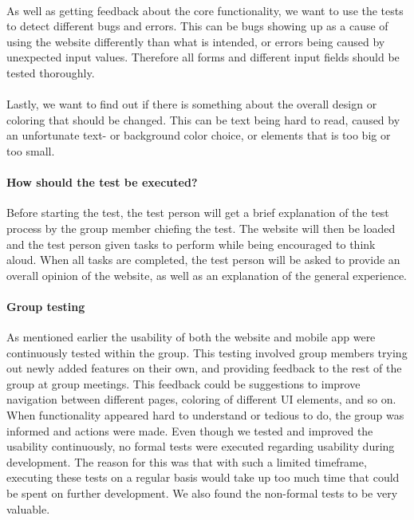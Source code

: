 \paragraph{} As well as getting feedback about the core functionality, we want to use the tests to detect different bugs and errors. This can be bugs showing up as a cause of using the website differently than what is intended, or errors being caused by unexpected input values. Therefore all forms and different input fields should be tested thoroughly.

\paragraph{} Lastly, we want to find out if there is something about the overall design or coloring that should be changed. This can be text being hard to read, caused by an unfortunate text- or background color choice, or elements that is too big or too small.  

\paragraph{How should the test be executed?} Before starting the test, the test person will get a brief explanation of the test process by the group member chiefing the test. The website will then be loaded and the test person given tasks to perform while being encouraged to think aloud. When all tasks are completed, the test person will be asked to provide an overall opinion of the website, as well as an explanation of the general experience. 

\paragraph{Group testing}
As mentioned earlier the usability of both the website and mobile app were continuously tested within the group. This testing involved group members trying out newly added features on their own, and providing feedback to the rest of the group at group meetings. This feedback could be suggestions to improve navigation between different pages, coloring of different UI elements, and so on. When functionality appeared hard to understand or tedious to do, the group was informed and actions were made. Even though we tested and improved the usability continuously, no formal tests were executed regarding usability during development. The reason for this was that with such a limited timeframe, executing these tests on a regular basis would take up too much time that could be spent on further development. We also found the non-formal tests to be very valuable.

